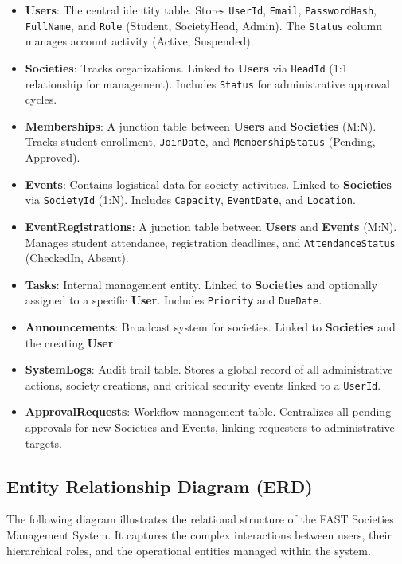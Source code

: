 \documentclass[12pt,a4paper]{article}
\begin{document}
\begin{itemize}
    \item \textbf{Users}: The central identity table. Stores \texttt{UserId}, \texttt{Email}, \texttt{PasswordHash}, \texttt{FullName}, and \texttt{Role} (Student, SocietyHead, Admin). The \texttt{Status} column manages account activity (Active, Suspended).
    \item \textbf{Societies}: Tracks organizations. Linked to \textbf{Users} via \texttt{HeadId} (1:1 relationship for management). Includes \texttt{Status} for administrative approval cycles.
    \item \textbf{Memberships}: A junction table between \textbf{Users} and \textbf{Societies} (M:N). Tracks student enrollment, \texttt{JoinDate}, and \texttt{MembershipStatus} (Pending, Approved).
    \item \textbf{Events}: Contains logistical data for society activities. Linked to \textbf{Societies} via \texttt{SocietyId} (1:N). Includes \texttt{Capacity}, \texttt{EventDate}, and \texttt{Location}.
    \item \textbf{EventRegistrations}: A junction table between \textbf{Users} and \textbf{Events} (M:N). Manages student attendance, registration deadlines, and \texttt{AttendanceStatus} (CheckedIn, Absent).
    \item \textbf{Tasks}: Internal management entity. Linked to \textbf{Societies} and optionally assigned to a specific \textbf{User}. Includes \texttt{Priority} and \texttt{DueDate}.
    \item \textbf{Announcements}: Broadcast system for societies. Linked to \textbf{Societies} and the creating \textbf{User}.
    \item \textbf{SystemLogs}: Audit trail table. Stores a global record of all administrative actions, society creations, and critical security events linked to a \texttt{UserId}.
    \item \textbf{ApprovalRequests}: Workflow management table. Centralizes all pending approvals for new Societies and Events, linking requesters to administrative targets.
\end{itemize}

\subsection{Entity Relationship Diagram (ERD)}
The following diagram illustrates the relational structure of the FAST Societies Management System. It captures the complex interactions between users, their hierarchical roles, and the operational entities managed within the system.
\end{document}
